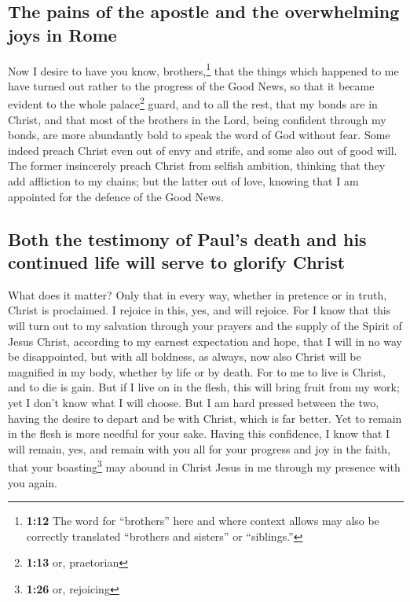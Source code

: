 \hypertarget{the-pains-of-the-apostle-and-the-overwhelming-joys-in-rome}{%
\subsection{The pains of the apostle and the overwhelming joys in
Rome}\label{the-pains-of-the-apostle-and-the-overwhelming-joys-in-rome}}

 Now I desire to have you know, brothers,\footnote{\textbf{1:12}
  The word for ``brothers'' here and where context allows may also be
  correctly translated ``brothers and sisters'' or ``siblings.''} that
the things which happened to me have turned out rather to the progress
of the Good News,  so that it became evident to the whole
palace\footnote{\textbf{1:13} or, praetorian} guard, and to all the
rest, that my bonds are in Christ,  and that most of the
brothers in the Lord, being confident through my bonds, are more
abundantly bold to speak the word of God without fear. 
Some indeed preach Christ even out of envy and strife, and some also out
of good will.  The former insincerely preach Christ from
selfish ambition, thinking that they add affliction to my chains;
 but the latter out of love, knowing that I am appointed
for the defence of the Good News.

\hypertarget{both-the-testimony-of-pauls-death-and-his-continued-life-will-serve-to-glorify-christ}{%
\subsection{Both the testimony of Paul's death and his continued life
will serve to glorify
Christ}\label{both-the-testimony-of-pauls-death-and-his-continued-life-will-serve-to-glorify-christ}}

 What does it matter? Only that in every way, whether in
pretence or in truth, Christ is proclaimed. I rejoice in this, yes, and
will rejoice.  For I know that this will turn out to my
salvation through your prayers and the supply of the Spirit of Jesus
Christ,  according to my earnest expectation and hope,
that I will in no way be disappointed, but with all boldness, as always,
now also Christ will be magnified in my body, whether by life or by
death.  For to me to live is Christ, and to die is gain.
 But if I live on in the flesh, this will bring fruit
from my work; yet I don't know what I will choose.  But I
am hard pressed between the two, having the desire to depart and be with
Christ, which is far better.  Yet to remain in the flesh
is more needful for your sake.  Having this confidence, I
know that I will remain, yes, and remain with you all for your progress
and joy in the faith,  that your boasting\footnote{\textbf{1:26}
  or, rejoicing} may abound in Christ Jesus in me through my presence
with you again.

